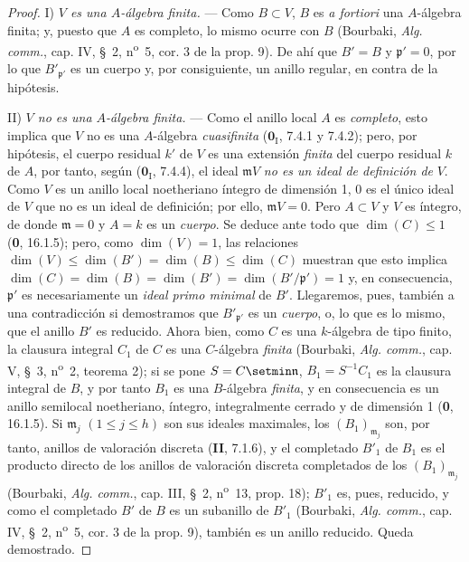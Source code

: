 \begin{proof}
I) \emph{$V$ es una $A$-álgebra finita.} --- Como $B\subset V$, $B$ es
\emph{a fortiori} una $A$-álgebra finita; y, puesto que $A$ es completo,
lo mismo ocurre con $B$ (Bourbaki, \emph{Alg. comm.}, cap. IV, \S~2,
n\textsuperscript{o}~5, cor. 3 de la prop. 9). De ahí que $B'=B$ y
$\mathfrak p'=0$, por lo que $B'_{\mathfrak p'}$ es un cuerpo y, por
consiguiente, un anillo regular, en contra de la hipótesis.

II) \emph{$V$ no es una $A$-álgebra finita.} --- Como el anillo local
$A$ es \emph{completo}, esto implica que $V$ no es una $A$-álgebra
\emph{cuasifinita} ($\mathbf{0}_{\mathrm I}$, 7.4.1 y 7.4.2); pero, por hipótesis, el
cuerpo residual $k'$ de $V$ es una extensión \emph{finita} del cuerpo residual
$k$ de $A$,
por tanto, según ($\mathbf{0}_{\mathrm I}$, 7.4.4), el ideal $\mathfrak mV$
\emph{no es un ideal de definición de} $V$. Como $V$ es un anillo local noetheriano
íntegro de dimensión 1, 0 es el único ideal de $V$ que no es un ideal
de definición; por ello, $\mathfrak mV=0$. Pero $A\subset V$ y $V$ es
íntegro, de donde $\mathfrak m=0$ y $A=k$ es un \emph{cuerpo}. Se deduce ante
todo que $\dim(C)\leqslant1$ (\textbf 0, 16.1.5); pero, como $\dim(V)=1$, las
relaciones
$\dim(V)\leqslant\dim(B')=\dim(B)\leqslant\dim(C)$
muestran que esto implica
$\dim(C)=\dim(B)=\dim(B')=\dim(B'/\mathfrak p')=1$ y, en consecuencia,
$\mathfrak p'$ es necesariamente un \emph{ideal primo minimal} de $B'$.
Llegaremos, pues, también a una contradicción si demostramos que
$B'_{\mathfrak p'}$ es un \emph{cuerpo}, o, lo que es lo mismo, que el anillo
$B'$ es reducido. Ahora bien, como $C$ es una $k$-álgebra de tipo finito,
la clausura integral $C_1$ de $C$ es una $C$-álgebra \emph{finita} (Bourbaki,
\emph{Alg. comm.}, cap. V, \S~3, n\textsuperscript{o}~2, teorema 2);
si se pone $S=C\setmin\mathfrak n$, $B_1=S^{-1}C_1$ es la clausura integral de
$B$, y por tanto $B_1$ es una $B$-álgebra \emph{finita}, y en consecuencia es
un anillo semilocal noetheriano, íntegro, integralmente cerrado y de
dimensión 1 (\textbf{0}, 16.1.5). Si $\mathfrak m_j$ $(1\leqslant j\leqslant h)$
son sus ideales maximales, los $(B_1)_{\mathfrak m_j}$ son, por tanto,
anillos de valoración discreta (\textbf{II}, 7.1.6), y el completado $B'_1$ de
$B_1$ es el producto directo de los anillos de valoración discreta
completados de los $(B_1)_{\mathfrak m_j}$ (Bourbaki, \emph{Alg. comm.},
cap. III, \S~2, n\textsuperscript{o}~13, prop. 18); $B'_1$ es, pues,
reducido, y como el completado $B'$ de $B$ es un subanillo de $B'_1$
(Bourbaki, \emph{Alg. comm.}, cap. IV, \S~2, n\textsuperscript{o}~5,
cor. 3 de la prop. 9), también es un anillo reducido. Queda demostrado.
\end{proof}
